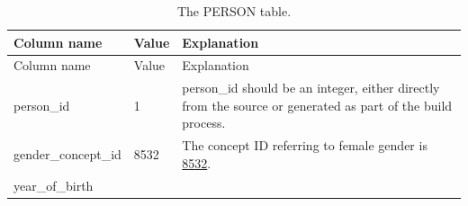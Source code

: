 \documentclass[11pt]{book}
\theoremstyle{definition}
\theoremstyle{definition}
\theoremstyle{definition}
\theoremstyle{remark}
\begin{document}
\begin{longtable}[]{@{}lll@{}}
\caption{\label{tab:person} The PERSON table.}\tabularnewline
\toprule
\begin{minipage}[b]{0.28\columnwidth}\raggedright
Column name\strut
\end{minipage} & \begin{minipage}[b]{0.15\columnwidth}\raggedright
Value\strut
\end{minipage} & \begin{minipage}[b]{0.49\columnwidth}\raggedright
Explanation\strut
\end{minipage}\tabularnewline
\midrule
\endfirsthead
\toprule
\begin{minipage}[b]{0.28\columnwidth}\raggedright
Column name\strut
\end{minipage} & \begin{minipage}[b]{0.15\columnwidth}\raggedright
Value\strut
\end{minipage} & \begin{minipage}[b]{0.49\columnwidth}\raggedright
Explanation\strut
\end{minipage}\tabularnewline
\midrule
\endhead
\begin{minipage}[t]{0.28\columnwidth}\raggedright
person\_id\strut
\end{minipage} & \begin{minipage}[t]{0.15\columnwidth}\raggedright
1\strut
\end{minipage} & \begin{minipage}[t]{0.49\columnwidth}\raggedright
person\_id should be an integer, either directly from the source or generated as part of the build process.\strut
\end{minipage}\tabularnewline
\begin{minipage}[t]{0.28\columnwidth}\raggedright
gender\_concept\_id\strut
\end{minipage} & \begin{minipage}[t]{0.15\columnwidth}\raggedright
8532\strut
\end{minipage} & \begin{minipage}[t]{0.49\columnwidth}\raggedright
The concept ID referring to female gender is \href{http://athena.ohdsi.org/search-terms/terms/8532}{8532}.\strut
\end{minipage}\tabularnewline
\begin{minipage}[t]{0.28\columnwidth}\raggedright
year\_of\_birth\strut
\end{minipage} & \begin{minipage}[t]{0.15\columnwidth}\raggedright

\end{minipage}
\end{longtable}
\end{document}
